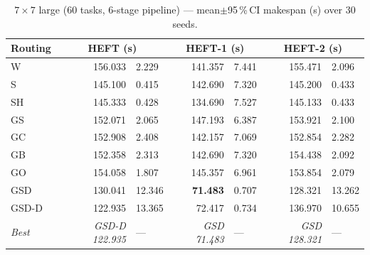 \documentclass[11pt]{article}
\newcommand{\win}[1]{\textcolor{green!50!black}{\textbf{#1}}}
\newcommand{\bad}[1]{\textcolor{red!70!black}{#1}}
\begin{document}
\begin{table}[H]\centering\small
\begin{tabular}{l r@{$\pm$}l r@{$\pm$}l r@{$\pm$}l}
\toprule
\textbf{Routing} & \multicolumn{2}{c}{\textbf{HEFT (s)}} & \multicolumn{2}{c}{\textbf{HEFT-1 (s)}} & \multicolumn{2}{c}{\textbf{HEFT-2 (s)}} \\
\midrule
  W & \bad{156.033} & 2.229 & 141.357 & 7.441 & \bad{155.471} & 2.096 \\
  S & 145.100 & 0.415 & 142.690 & 7.320 & 145.200 & 0.433 \\
  SH & 145.333 & 0.428 & 134.690 & 7.527 & 145.133 & 0.433 \\
  GS & 152.071 & 2.065 & \bad{147.193} & 6.387 & 153.921 & 2.100 \\
  GC & 152.908 & 2.408 & 142.157 & 7.069 & 152.854 & 2.282 \\
  GB & 152.358 & 2.313 & 142.690 & 7.320 & 154.438 & 2.092 \\
  GO & 154.058 & 1.807 & 145.357 & 6.961 & 153.854 & 2.079 \\
  GSD & 130.041 & 12.346 & \win{71.483} & 0.707 & 128.321 & 13.262 \\
  GSD-D & 122.935 & 13.365 & 72.417 & 0.734 & 136.970 & 10.655 \\
\midrule
  \textit{Best} & \textit{GSD-D 122.935} & --- & \textit{GSD 71.483} & --- & \textit{GSD 128.321} & --- \\
\bottomrule\end{tabular}
\caption{$7\times7$ large (60 tasks, 6-stage pipeline) --- mean$\pm$95\,\%\,CI makespan (s) over 30 seeds.}
\end{table}
\end{document}
